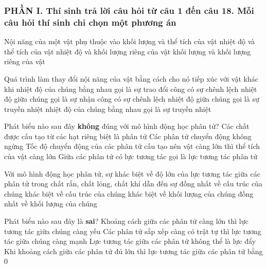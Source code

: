 \subsubsection*{PHẦN I. Thí sinh trả lời câu hỏi từ câu 1 đến câu 18. Mỗi câu hỏi thí sinh chỉ chọn một phương án}
\setcounter{ex}{0}
\begin{ex}
Nội năng của một vật phụ thuộc vào
\choice
{khối lượng và thể tích của vật}
{\True nhiệt độ và thể tích của vật}
{nhiệt độ và khối lượng riêng của vật}
{khối lượng và khối lượng riêng của vật}
\loigiai{}
\end{ex}

\begin{ex}
Quá trình làm thay đổi nội năng của vật bằng cách cho nó tiếp xúc với vật khác khi
\choice
{nhiệt độ của chúng bằng nhau gọi là sự trao đổi công}
{có sự chênh lệch nhiệt độ giữa chúng gọi là sự nhận công}
{\True có sự chênh lệch nhiệt độ giữa chúng gọi là sự truyền nhiệt}
{nhiệt độ của chúng bằng nhau gọi là sự truyền nhiệt}
\loigiai{}
\end{ex}

\begin{ex}
Phát biểu nào sau đây \textbf{không} đúng với mô hình động học phân tử?
\choice
{Các chất được cấu tạo từ các hạt riêng biệt là phân tử}
{Các phân tử chuyển động không ngừng}
{\True Tốc độ chuyển động của các phân tử cấu tạo nên vật càng lớn thì thể tích của vật càng lớn}
{Giữa các phân tử có lực tương tác gọi là lực tương tác phân tử}
\loigiai{}
\end{ex}

\begin{ex}
Với mô hình động học phân tử, sự khác biệt về độ lớn của lực tương tác giữa các phân tử trong chất rắn, chất lỏng, chất khí dẫn đến sự
\choice
{đồng nhất về cấu trúc của chúng}
{\True khác biệt về cấu trúc của chúng}
{khác biệt về khối lượng của chúng}
{đồng nhất về khối lượng của chúng}
\loigiai{}
\end{ex}

\begin{ex}
Phát biểu nào sau đây là \textbf{sai}?
\choice
{Khoảng cách giữa các phân tử càng lớn thì lực tương tác giữa chúng càng yếu}
{Các phân tử sắp xếp càng có trật tự thì lực tương tác giữa chúng càng mạnh}
{\True Lực tương tác giữa các phân tử không thể là lực đẩy}
{Khi khoảng cách giữa các phân tử đủ lớn thì lực tương tác giữa các phân tử bằng 0}
\loigiai{}
\end{ex}

